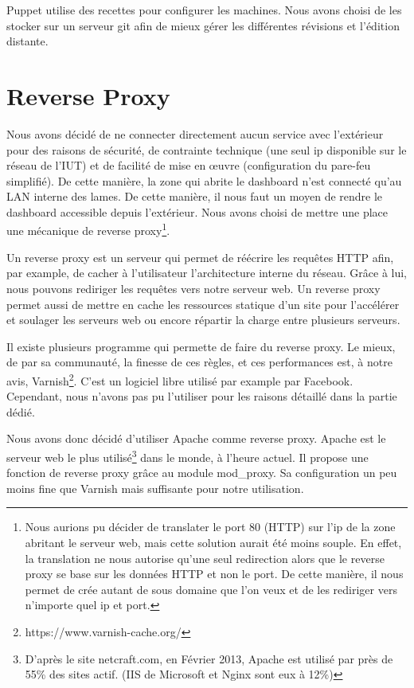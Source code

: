 \documentclass[a4paper,oneside]{report}
\begin{document}
Puppet utilise des recettes pour configurer les machines.
Nous avons choisi de les stocker sur un serveur git afin de mieux gérer les différentes révisions et l'édition distante.

\section{Reverse Proxy}
Nous avons décidé de ne connecter directement aucun service avec l'extérieur pour des raisons de sécurité, de contrainte technique (une seul ip disponible sur le réseau de l'IUT) et de facilité de mise en œuvre (configuration du pare-feu simplifié).
De cette manière, la zone qui abrite le dashboard n'est connecté qu'au LAN interne des lames.
De cette manière, il nous faut un moyen de rendre le dashboard accessible depuis l'extérieur. Nous avons choisi de mettre une place une mécanique de reverse proxy\footnote{Nous aurions pu décider de translater le port 80 (HTTP) sur l'ip de la zone abritant le serveur web, mais cette solution aurait été moins souple.
En effet, la translation ne nous autorise qu'une seul redirection alors que le reverse proxy se base sur les données HTTP et non le port. De cette manière, il nous permet de crée autant de sous domaine que l'on veux et de les rediriger vers n'importe quel ip et port.}.

Un reverse proxy est un serveur qui permet de réécrire les requêtes HTTP afin, par example, de cacher à l'utilisateur l'architecture interne du réseau.
Grâce à lui, nous pouvons rediriger les requêtes vers notre serveur web.
Un reverse proxy permet aussi de mettre en cache les ressources statique d'un site pour l'accélérer et soulager les serveurs web ou encore répartir la charge entre plusieurs serveurs.

Il existe plusieurs programme qui permette de faire du reverse proxy.
Le mieux, de par sa communauté, la finesse de ces règles, et ces performances est, à notre avis, Varnish\footnote{https://www.varnish-cache.org/}.
C'est un logiciel libre utilisé par example par Facebook. Cependant, nous n'avons pas pu l'utiliser pour les raisons détaillé dans la partie dédié.

Nous avons donc décidé d'utiliser Apache comme reverse proxy. Apache est le serveur web le plus utilisé\footnote{D'après le site netcraft.com, en Février 2013, Apache est utilisé par près de 55\% des sites actif. (IIS de Microsoft et Nginx sont eux à 12\%)} dans le monde, à l'heure actuel.
Il propose une fonction de reverse proxy grâce au module mod\_proxy. Sa configuration un peu moins fine que Varnish mais suffisante pour notre utilisation.
\end{document}

